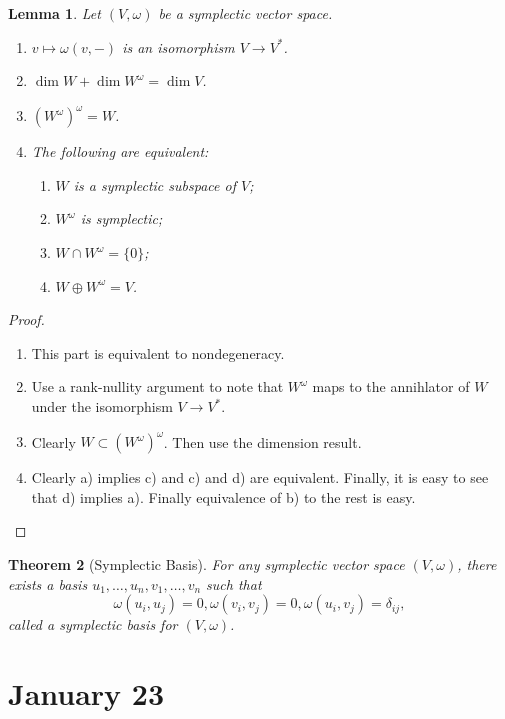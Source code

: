 \documentclass[leqno, openany]{memoir}
\newtheorem{thm}{Theorem}[chapter]
\newtheorem{lem}[thm]{Lemma}
\theoremstyle{definition}
\theoremstyle{remark}
\theoremstyle{plain}
\theoremstyle{definition}
\theoremstyle{remark}
\begin{document}
\begin{lem}
    Let $(V, \omega)$ be a symplectic vector space.
    \begin{enumerate}
        \item $v \mapsto \omega(v,-)$ is an isomorphism $V \to V^*$.
        \item $\dim W + \dim W^{\omega} = \dim V$.
        \item ${ (W^{\omega}) }^{\omega} = W$.
        \item The following are equivalent:
            \begin{enumerate}
                \item $W$ is a symplectic subspace of $V$;
                \item $W^{\omega}$ is symplectic;
                \item $W \cap W^{\omega} = \{0\}$;
                \item $W \oplus W^{\omega} = V$.
            \end{enumerate}
    \end{enumerate}
\end{lem}

\begin{proof}
    \begin{enumerate}
        \item This part is equivalent to nondegeneracy.
        \item Use a rank-nullity argument to note that $W^{\omega}$ maps to the annihlator of $W$ under the isomorphism $V \to V^*$.
        \item Clearly $W \subset { (W^{\omega}) }^{\omega}$. Then use the dimension result.
        \item Clearly a) implies c) and c) and d) are equivalent. Finally, it is easy to see that d) implies a). Finally equivalence of b) to the rest is easy.
    \end{enumerate}
\end{proof}

\begin{thm}[Symplectic Basis]
    For any symplectic vector space $(V, \omega)$, there exists a basis $u_1, \ldots, u_n, v_1, \ldots, v_n$ such that
    \[ \omega(u_i,u_j) = 0, \omega(v_i, v_j) = 0, \omega(u_i, v_j) = \delta_{ij},\]
    called a \textit{symplectic basis for $(V, \omega)$}.
\end{thm}

\chapter{January 23}%
\label{cha:january_23}
\end{document}
